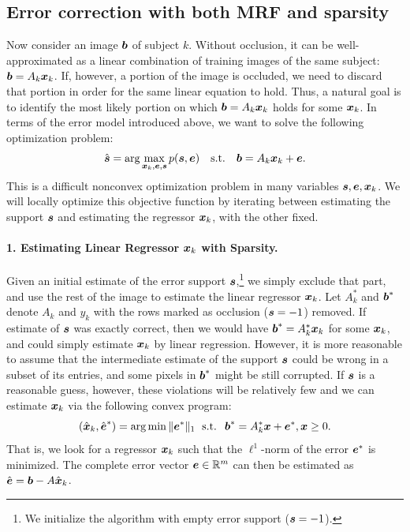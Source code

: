 \subsection{Error correction with both MRF and sparsity}
Now consider an image $\boldsymbol{b}$ of subject $k$. Without occlusion, it can be well-approximated as a linear combination of training images of the same subject: $\boldsymbol{b} = A_k {\boldsymbol{x}}_k$. If, however, a portion of the image is occluded, we need to discard that portion in order for the same linear equation to hold. Thus, a natural goal is to identify the most likely portion  on which $\boldsymbol{b} = A_k {\boldsymbol{x}}_k$ holds for some ${\boldsymbol{x}}_k$. In terms of the error model introduced above, we want to solve the following optimization problem:
\begin{equation}
\hat {\boldsymbol{s}} = \mbox{arg}\max_{{\boldsymbol{x}}_k,\boldsymbol{e},\boldsymbol{s}} p(\boldsymbol{s}, \boldsymbol{e}) \quad \mbox{s.t.} \quad \boldsymbol{b} = A_k {\boldsymbol{x}}_k + \boldsymbol{e}.
\end{equation}
This is a difficult nonconvex optimization problem in many variables $\boldsymbol{s}, \boldsymbol{e}, {\boldsymbol{x}}_k$. We will locally optimize this objective function by iterating between estimating the support $\boldsymbol{s}$ and estimating the regressor ${\boldsymbol{x}}_k$, with the other fixed.

\paragraph{1. Estimating Linear Regressor ${\boldsymbol{x}}_k$ with Sparsity.}
Given an initial estimate of the error support $\boldsymbol{s}$,\footnote{We initialize the algorithm with empty error support ($\boldsymbol{s} = -1$).} we simply exclude that part, and use the rest of the image to estimate the linear regressor ${\boldsymbol{x}}_k$. Let $A_k^*$ and $\boldsymbol{b}^*$ denote $A_k$ and $y_k$ with the rows marked as occlusion ($\boldsymbol{s} = -1$) removed.
If estimate of $\boldsymbol{s}$ was exactly correct, then we would have $\boldsymbol{b}^* = A_k^* {\boldsymbol{x}}_k$ for some ${\boldsymbol{x}}_k$, and could simply estimate ${\boldsymbol{x}}_k$ by linear regression. However, it is more reasonable to assume that the intermediate estimate of the support $\boldsymbol{s}$ could be wrong in a subset of its entries, and some pixels in $\boldsymbol{b}^*$ might be still corrupted. If $\boldsymbol{s}$ is a reasonable guess, however, these violations will be relatively few and we can estimate ${\boldsymbol{x}}_k$ via the following convex program:
\begin{equation}
(\hat{{\boldsymbol{x}}}_k,\hat{\boldsymbol{e}}^*) = \arg\min \|\boldsymbol{e}^*\|_1  \; \textup{ s.t. } \; \boldsymbol{b}^* = A_k^*{\boldsymbol{x}}+\boldsymbol{e}^*, {\boldsymbol{x}}\geq
0.
\end{equation}
That is, we look for a regressor ${\boldsymbol{x}}_k$ such that the $\ell^1$-norm of the error $\boldsymbol{e}^*$ is minimized. The complete error vector $\boldsymbol{e} \in \mathbb R^m$ can then be estimated as $\hat {\boldsymbol{e}} = \boldsymbol{b} - A \hat{{\boldsymbol{x}}}_k$.

